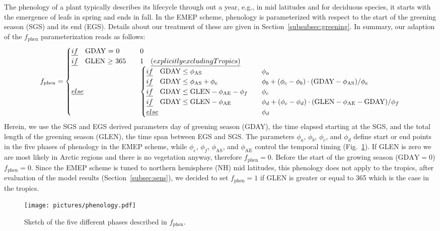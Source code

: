 \documentclass[gmd, manuscript]{copernicus}
\begin{document}
The phenology of a plant typically describes its lifecycle through out a year, e.g., in mid latitudes and for deciduous species, it starts with the emergence of leafs in spring and ends in fall. In the EMEP scheme, phenology is parameterized with respect to the start of the greening season (SGS) and its end (EGS). Details about our treatment of these are given in Section~\ref{subsubsec:greening}. In summary, our adaption of the $f_\text{phen}$ parameterization reads as follows:
%
\begin{equation}
  f_\text{phen} =
  \begin{cases}
    \emph{if} \quad \text{GDAY = 0}  & \quad 0 \\
    \emph{if} \quad \text{GLEN $\ge$ 365} & \quad 1 \quad \emph{(explicitly excluding Tropics)} \\
    \emph{else}  & \quad 
    \begin{cases}
      \emph{if} \quad \text{GDAY} \le \phi_\text{AS}  & \quad \phi_a \\
      \emph{if} \quad \text{GDAY} \le \phi_\text{AS} + \phi_e  & \quad \phi_b+(\phi_c-\phi_b)\cdot(\text{GDAY}-\phi_\text{AS})/\phi_e\\
      \emph{if} \quad \text{GDAY} \le \text{GLEN} - \phi_\text{AE} - \phi_f  & \quad \phi_c\\
      \emph{if} \quad \text{GDAY} \le \text{GLEN} - \phi_\text{AE}  & \quad \phi_d+(\phi_c-\phi_d)\cdot(\text{GLEN}-\phi_\text{AE}-\text{GDAY})/\phi_f\\
      \emph{else} & \quad \phi_d
    \end{cases}
  \end{cases}
  \label{eq:fphen}
\end{equation}
%
Herein, we use the SGS and EGS derived parameters day of greening season (GDAY), the time elapsed starting at the SGS, and the total length of the greening season (GLEN), the time span between EGS and SGS. The parameters $\phi_a$, $\phi_b$, $\phi_c$, and $\phi_d$ define start or end points in the five phases of phenology in the EMEP scheme, while $\phi_e$, $\phi_f$, $\phi_\text{AS}$, and $\phi_\text{AE}$ control the temporal timing (Fig.~\ref{fig:phenology}). If GLEN is zero we are most likely in Arctic regions and there is no vegetation anyway, therefore $f_\text{phen}=0$. Before the start of the growing season ($\text{GDAY}=0$) $f_\text{phen}=0$. Since the EMEP scheme is tuned to northern hemisphere (NH) mid latitudes, this phenology does not apply to the tropics, after evaluation of the model results (Section~\ref{subsec:sens}), we decided to set $f_\text{phen}=1$ if GLEN is greater or equal to 365 which is the case in the tropics.
%
\begin{figure}[t]
  \texttt{[image: pictures/phenology.pdf]}
  \caption{Sketch of the five different phases described in $f_\text{phen}$.}
  \label{fig:phenology}
\end{figure}
\end{document}
